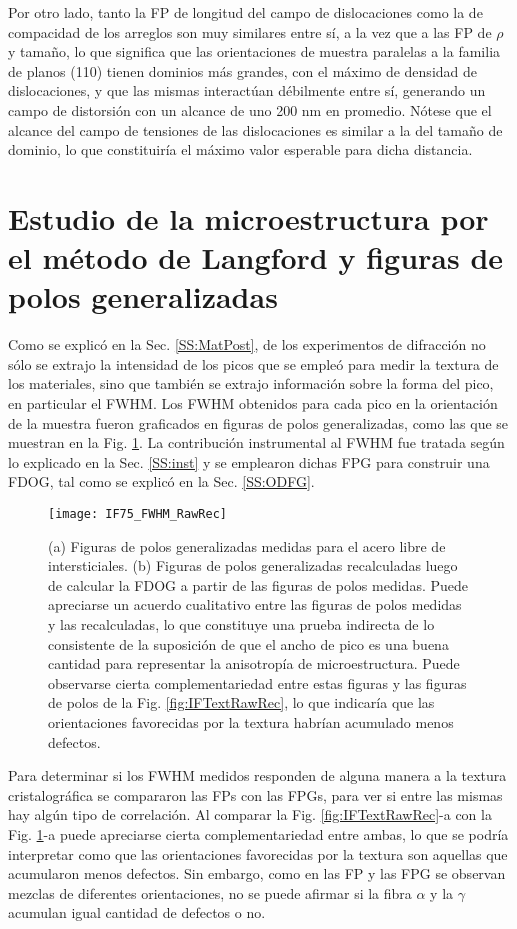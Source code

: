 Por otro lado, tanto la FP de longitud del campo de dislocaciones como la de compacidad de los arreglos son muy similares entre sí, a la vez que a las FP de $\rho$ y tamaño, lo que significa que las orientaciones de muestra paralelas a la familia de planos (110) tienen dominios más grandes, con el máximo de densidad de dislocaciones, y que las mismas interactúan débilmente entre sí, generando un campo de distorsión con un alcance de uno 200 nm en promedio. Nótese que el alcance del campo de tensiones de las dislocaciones es similar a la del tamaño de dominio, lo que constituiría el máximo valor esperable para dicha distancia.

\section{Estudio de la microestructura por el método de Langford y figuras de polos generalizadas}\label{S:IFLANG}
Como se explicó en la Sec. \ref{SS:MatPost}, de los experimentos de difracción no sólo se extrajo la intensidad de los picos que se empleó para medir la textura de los materiales, sino que también se extrajo información sobre la forma del pico, en particular el FWHM.
Los FWHM obtenidos para cada pico en la orientación de la muestra fueron graficados en figuras de polos generalizadas, como las que se muestran en la Fig. \ref{fig:IFFWHMRawRec}.
La contribución instrumental al FWHM fue tratada según lo explicado en la Sec. \ref{SS:inst} y se emplearon dichas FPG para construir una FDOG, tal como se explicó en la Sec. \ref{SS:ODFG}.

\begin{figure}[!htb]
  \centering
  \texttt{[image: IF75\_FWHM\_RawRec]}
  \caption{(a) Figuras de polos generalizadas medidas para el acero libre de intersticiales. (b) Figuras de polos generalizadas recalculadas luego de calcular la FDOG a partir de las figuras de polos medidas. Puede apreciarse un acuerdo cualitativo entre las figuras de polos medidas y las recalculadas, lo que constituye una prueba indirecta de lo consistente de la suposición de que el ancho de pico es una buena cantidad para representar la anisotropía de microestructura. Puede observarse cierta complementariedad entre estas figuras y las figuras de polos de la Fig. \ref{fig:IFTextRawRec}, lo que indicaría que las orientaciones favorecidas por la textura habrían acumulado menos defectos.}
  \label{fig:IFFWHMRawRec}
\end{figure}

Para determinar si los FWHM medidos responden de alguna manera a la textura cristalográfica se compararon las FPs con las FPGs, para ver si entre las mismas hay algún tipo de correlación.
Al comparar la Fig. \ref{fig:IFTextRawRec}-a con la Fig. \ref{fig:IFFWHMRawRec}-a puede apreciarse cierta complementariedad entre ambas, lo que se podría interpretar como que las orientaciones favorecidas por la textura son aquellas que acumularon menos defectos.
Sin embargo, como en las FP y las FPG se observan mezclas de diferentes orientaciones, no se puede afirmar si la fibra $\alpha$ y la $\gamma$ acumulan igual cantidad de defectos o no.

